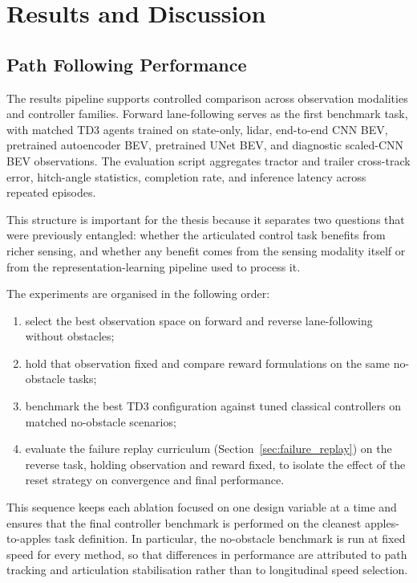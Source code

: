 \chapter{Results and Discussion}
\label{ch:results}

\section{Path Following Performance}

The results pipeline supports controlled comparison across observation modalities and controller families. Forward lane-following serves as the first benchmark task, with matched TD3 agents trained on state-only, lidar, end-to-end CNN BEV, pretrained autoencoder BEV, pretrained UNet BEV, and diagnostic scaled-CNN BEV observations. The evaluation script aggregates tractor and trailer cross-track error, hitch-angle statistics, completion rate, and inference latency across repeated episodes.

This structure is important for the thesis because it separates two questions that were previously entangled: whether the articulated control task benefits from richer sensing, and whether any benefit comes from the sensing modality itself or from the representation-learning pipeline used to process it.

The experiments are organised in the following order:
\begin{enumerate}
    \item select the best observation space on forward and reverse lane-following without obstacles;
    \item hold that observation fixed and compare reward formulations on the same no-obstacle tasks;
    \item benchmark the best TD3 configuration against tuned classical controllers on matched no-obstacle scenarios;
    \item evaluate the failure replay curriculum (Section~\ref{sec:failure_replay}) on the reverse task, holding observation and reward fixed, to isolate the effect of the reset strategy on convergence and final performance.
\end{enumerate}

This sequence keeps each ablation focused on one design variable at a time and ensures that the final controller benchmark is performed on the cleanest apples-to-apples task definition. In particular, the no-obstacle benchmark is run at fixed speed for every method, so that differences in performance are attributed to path tracking and articulation stabilisation rather than to longitudinal speed selection.

